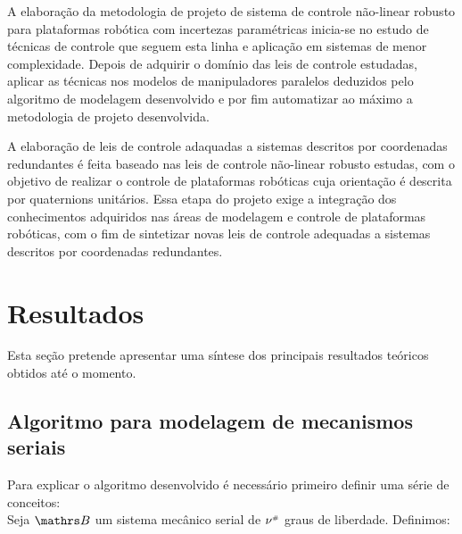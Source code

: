 \documentclass[a4paper,11pt,brazil,fleqn]{article}
\begin{document}
A elabora\c{c}\~ao da metodologia de projeto de sistema de controle n\~ao-linear robusto para plataformas rob\'otica com incertezas param\'etricas inicia-se no estudo de t\'ecnicas de controle que seguem esta linha e aplica\c{c}\~ao em sistemas de menor complexidade. Depois de adquirir o dom\'inio das leis de controle estudadas, aplicar as t\'ecnicas nos modelos de manipuladores paralelos deduzidos pelo algoritmo de modelagem desenvolvido e por fim automatizar ao m\'aximo a metodologia de projeto desenvolvida.

A elabora\c{c}\~ao de leis de controle adaquadas a sistemas descritos por coordenadas redundantes \'e feita baseado nas leis de controle n\~ao-linear robusto estudas, com o objetivo de realizar o controle de plataformas rob\'oticas cuja orienta\c{c}\~ao \'e descrita por quaternions unit\'arios. Essa etapa do projeto exige a integra\c{c}\~ao dos conhecimentos adquiridos nas \'areas de modelagem e controle de plataformas rob\'oticas, com o fim de sintetizar novas leis de controle adequadas a sistemas descritos por coordenadas redundantes.


\section{Resultados}\label{S04}

Esta se\c{c}\~ao pretende apresentar uma s\'intese dos principais resultados te\'oricos obtidos at\'e o momento.

\subsection{Algoritmo para modelagem de mecanismos seriais}\label{S04-1}

Para explicar o algoritmo desenvolvido \'e necess\'ario primeiro definir uma s\'erie de conceitos: \\

Seja $\ssB$ um sistema mec\^anico serial de $\nu^{\scriptscriptstyle \#}$ graus de liberdade. Definimos:
\end{document}
